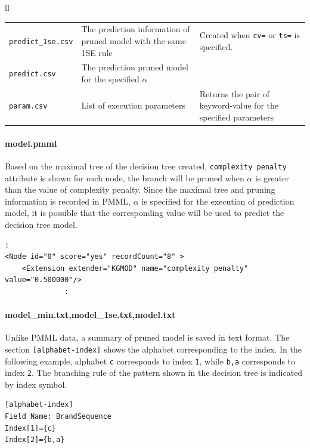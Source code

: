 \begin{table}[!htbp]
\begin{center}
\begin{tabular}{ll}
\begin{minipage}{1.0\hsize}
\begin{center}
{\begin{tabular}{ | l p{7cm} | p{7cm} |}
\verb|predict_1se.csv|    & The prediction information of pruned model with the same 1SE rule   & Created when  \verb|cv=| or  \verb|ts=| is specified.   \\
\verb|predict.csv|        & The prediction pruned model for the specified $\alpha$ & \\
\verb|param.csv|          & List of execution parameters                       & Returns the pair of keyword-value for the specified parameters \\
\hline
\end{tabular} 
}
\end{center}
\end{minipage}

\end{tabular} 
\end{center}
\end{table} 

\paragraph{model.pmml}
Based on the maximal tree of the decision tree created, \verb|complexity penalty| attribute is shown for each node,  the branch will be pruned when $\alpha$ is greater than the value of complexity penalty. Since the maximal tree and pruning information is recorded in PMML, $\alpha$ is specified for the execution of prediction model, it is possible that the corresponding value will be used to predict the decision tree model.  

\begin{Verbatim}[baselinestretch=0.7,frame=single]
              :
<Node id="0" score="yes" recordCount="8" >
    <Extension extender="KGMOD" name="complexity penalty" value="0.500000"/>
              :
\end{Verbatim}


\paragraph{model\_min.txt,model\_1se.txt,model.txt}
Unlike PMML data, a summary of pruned model is saved in text format. The section \verb|[alphabet-index]| shows the alphabet corresponding to the index. In the following example, alphabet \verb|c| corresponds to index \verb|1|, while \verb|b,a| corresponds to index \verb|2|. The branching rule of the pattern shown in the decision tree is indicated by index symbol.

\begin{Verbatim}[baselinestretch=0.7,frame=single]
[alphabet-index]
Field Name: BrandSequence
Index[1]={c}
Index[2]={b,a}
\end{Verbatim}

